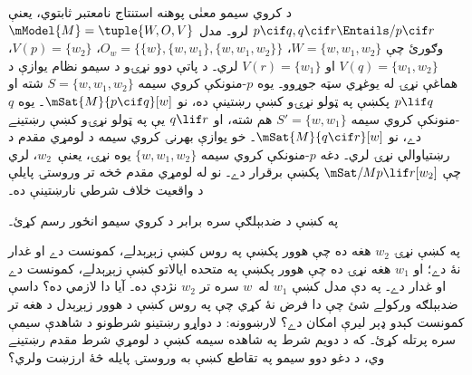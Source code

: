 \documentclass[../../../include/open-logic-section]{subfiles}
\begin{document}
\begin{ex}
  د کروي سيمو معنٰی پوهنه استنتاج نامعتبر ثابتوي، يعنې $p
  \cif q, q \cif r \Entails/ p \cif r$ لرو۔ مدل $\mModel{M}
  = \tuple{W, O, V}$ وګورئ چې $W = \{w, w_1, w_2\}$، $O_w = \{\{w\}, \{w,
  w_1\}, \{w, w_1, w_2\}\}$، $V(p) = \{w_2\}$، $V(q) = \{w_1, w_2\}$
  او $V(r) = \{w_1\}$ لري۔ د پاتې دوو نړۍو د سيمو نظام
  يوازې د هماغې نړۍ له يوغړي سټه جوړوو۔ يوه $p$-منونکې کروي سيمه $S = \{w, w_1,
  w_2\}$ شته او $p \lif q$ پکښې په ټولو نړۍو کښې رښتينې ده،
  نو $\mSat{M}{p
    \cif q}[w]$۔ يوه $q$-منونکې کروي سيمه $S' = \{w,
  w_1\}$ هم شته، او $q \lif r$ يې په ټولو نړۍو کښې رښتينے
  دے، نو $\mSat{M}{q \cif r}[w]$۔ خو يوازې
  بهرنۍ کروي سيمه د لومړي مقدم د رښتياوالي نړۍ لري۔ دغه
  $p$-منونکې کروي سيمه $\{w,
  w_1, w_2\}$ يوه نړۍ، يعنې~$w_2$، لري چې
  $\mSat/{M}{p \lif
    r}[w_2]$ پکښې برقرار دے۔ نو له لومړي مقدم څخه تر
  وروستۍ پايلې د واقعيت خلاف شرطي نارښتينې ده۔
\end{ex}

\begin{prob}
په  کښې د ضدبېلګې
سره برابر د کروي سيمو انځور رسم کړئ۔
\end{prob}

\begin{prob}
  په  کښې نړۍ $w_2$
  هغه ده چې هوور پکښې په روس کښې زېږېدلے، کمونست دے او
  غدار نۀ دے؛ او $w_1$ هغه نړۍ ده چې هوور پکښې په متحده
  ايالاتو کښې زېږېدلے، کمونست دے او غدار دے۔ په دې مدل کښې
  $w_1$ له~$w$ سره تر $w_2$ نژدې ده۔ آيا دا لازمي ده؟ داسې
  ضدبېلګه ورکولے شئ چې دا فرض نۀ کړي چې په روس کښې د هوور
  زېږېدل د هغه تر کمونست کېدو ډېر ليرې امکان دے؟ لارښوونه:
  د دواړو رښتينو شرطونو د شاهدې سيمې سره پرتله کړئ۔ که د
  دويم شرط په شاهده سيمه کښې د لومړي شرط مقدم رښتينے وي،
  د دغو دوو سيمو په تقاطع کښې به وروستۍ پايله څۀ ارزښت ولري؟
\end{prob}
\end{document}
